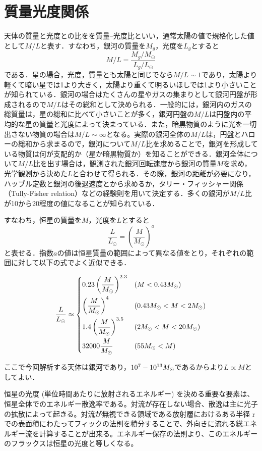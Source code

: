 \section{質量光度関係}

天体の質量と光度との比をを質量--光度比といい，通常太陽の値で規格化した値として$M/L$と表す．すなわち，銀河の質量を$M_g$，光度を$L_g$とすると
\begin{equation}
	M/L = \frac{M_g/M_\odot}{L_g/L_\odot}
\end{equation}
である．星の場合，光度，質量とも太陽と同じでなら$M/L \sim 1$であり，太陽より軽くて暗い星では1より大きく，太陽より重くて明るいほしでは1より小さいことが知られている．銀河の場合はたくさんの星やガスの集まりとして銀河円盤が形成されるので$M/L$はその総和として決められる．一般的には，銀河内のガスの総質量は，星の総和に比べて小さいことが多く，銀河円盤の$M/L$は円盤内の平均的な星の質量と光度によって決まっている．また，暗黒物質のように光を一切出さない物質の場合は$M/L \sim \infty$となる。実際の銀河全体の$M/L$は，円盤とハローの総和から求まるので，銀河について$M/L$比を求めることで，銀河を形成している物質は何が支配的か（星か暗黒物質か）を知ることができる．銀河全体について$M/L$比を出す場合は，観測された銀河回転速度から銀河の質量$M$を求め，光学観測から決めた$L$と合わせて得られる．その際，銀河の距離が必要になり，ハッブル定数と銀河の後退速度とから求めるか，タリー・フィッシャー関係（Tully-Fisher relation）などの経験則を用いて決定する．多くの銀河が$M/L$比が10から20程度の値になることが知られている．


すなわち，恒星の質量を$M$，光度を$L$とすると
\begin{equation}
    \frac{L}{L_\odot} = \left(\frac{M}{M_\odot}\right)^{a}
\end{equation}
と表せる．指数$a$の値は恒星質量の範囲によって異なる値をとり，それぞれの範囲に対して以下の式でよく近似できる．

\begin{align}
	\frac{L}{L_\odot} \approx \begin{dcases}
		0.23 \left(\frac{M}{M_\odot}\right)^{2.3} & (M<0.43 M_\odot) \\
		\left( \frac{M}{M_\odot} \right)^4 & (0.43M_\odot < M <2 M_\odot) \\
		1.4 \left(\frac{M}{M_\odot}\right)^{3.5} & (2M_\odot < M < 20 M_\odot) \\
		32000 \frac{M}{M_\odot} & (55 M_\odot < M)
	\end{dcases}
\end{align}

ここで今回解析する天体は銀河であり，$10^{7}\--10^{13} M_\odot$であるからより$L \propto M$としてよい．


恒星の光度 (単位時間あたりに放射されるエネルギー) を決める重要な要素は、恒星全体でのエネルギー散逸率である。対流が存在しない場合、散逸は主に光子の拡散によって起きる。対流が無視できる領域である放射層におけるある半径 r での表面積にわたってフィックの法則を積分することで、外向きに流れる総エネルギー流を計算することが出来る。エネルギー保存の法則より、このエネルギーのフラックスは恒星の光度と等しくなる。 